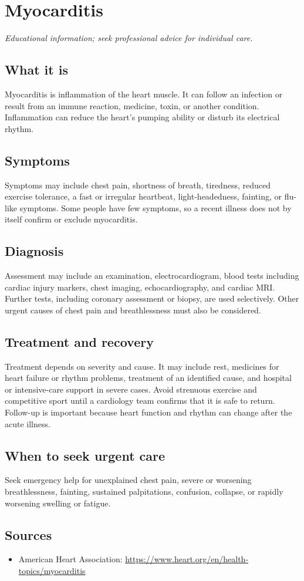 \chapter{Myocarditis}

\medskip
\noindent\textit{Educational information; seek professional advice for individual care.}

\section*{What it is}
Myocarditis is inflammation of the heart muscle. It can follow an infection or result from an immune reaction, medicine, toxin, or another condition. Inflammation can reduce the heart’s pumping ability or disturb its electrical rhythm.

\section*{Symptoms}
Symptoms may include chest pain, shortness of breath, tiredness, reduced exercise tolerance, a fast or irregular heartbeat, light-headedness, fainting, or flu-like symptoms. Some people have few symptoms, so a recent illness does not by itself confirm or exclude myocarditis.

\section*{Diagnosis}
Assessment may include an examination, electrocardiogram, blood tests including cardiac injury markers, chest imaging, echocardiography, and cardiac MRI. Further tests, including coronary assessment or biopsy, are used selectively. Other urgent causes of chest pain and breathlessness must also be considered.

\section*{Treatment and recovery}
Treatment depends on severity and cause. It may include rest, medicines for heart failure or rhythm problems, treatment of an identified cause, and hospital or intensive-care support in severe cases. Avoid strenuous exercise and competitive sport until a cardiology team confirms that it is safe to return. Follow-up is important because heart function and rhythm can change after the acute illness.

\section*{When to seek urgent care}
Seek emergency help for unexplained chest pain, severe or worsening breathlessness, fainting, sustained palpitations, confusion, collapse, or rapidly worsening swelling or fatigue.

\section*{Sources}
\begin{itemize}
\item American Heart Association: \url{https://www.heart.org/en/health-topics/myocarditis}
\end{itemize}
